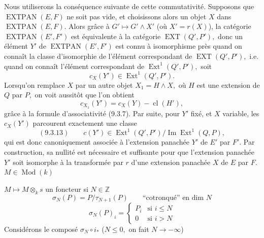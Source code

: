 Nous utiliserons la conséquence suivante de cette commutativité. Supposons que \(\operatorname{EXTPAN}(E,F)\) ne soit pas vide, et choisissons alors un objet \(X\) dans \(\operatorname{EXTPAN}(E,F).\) Alors grâce à \(G'\longmapsto G'\wedge X'\) (où \(X'=r(X)\)), la catégorie \(\operatorname{EXTPAN}(E',F')\) est équivalente à la catégorie \(\operatorname{EXT}(Q',P'),\) donc un élément \(Y'\) de \(\operatorname{EXTPAN}(E',F')\) est connu à isomorphisme près quand on connaît la classe d'isomorphie de l'élément correspondant de \(\operatorname{EXT}(Q',P'),\) i.e. quand on connaît l'élément correspondant de \(\operatorname{Ext}^1(Q',P'),\) soit
\[
c_X(Y')\in\operatorname{Ext}^1(Q',P').
\]
Lorsqu'on remplace \(X\) par un autre objet \(X_1=H\wedge X,\) où \(H\) est une extension de \(Q\) par \(P,\) on voit aussitôt que l'on obtient
\[
c_{X_1}(Y')=c_X(Y)-\operatorname{cl}(H'),
\]
grâce à la formule d'associativité (9.3.7). Par suite, pour \(Y'\) fixé, et \(X\) variable, les \(c_X(Y')\) parcourent exactement une classe
\[
(9.3.13)\qquad c(Y')\in\operatorname{Ext}^1(Q',P')/\operatorname{Im}\operatorname{Ext}^1(Q,P),
\]
qui est donc canoniquement associée à l'extension panachée \(Y'\) de \(E'\) par \(F'.\) Par construction, sa nullité est nécessaire et suffisante pour que l'extension panachée \(Y'\) soit isomorphe à la transformée par \(r\) d'une extension panachée \(X\) de \(E\) par \(F.\)
\(M\in\operatorname{Mod}(k)\)

\(M\longmapsto M\otimes_k s\) un foncteur
si \(N\in\mathbb Z\)
\[
\sigma_N(P)=P/\tau_{N+1}(P)\qquad\text{``cotronqué'' en dim }N
\]
\[
\sigma_N(P)_i=\begin{cases}P_i&\text{si }i\leq N\\0&\text{si }i>N\end{cases}
\]
Considérons le composé \(\sigma_N\circ i_*\) (\(N\leq0,\) on fait \(N\longrightarrow-\infty\))

